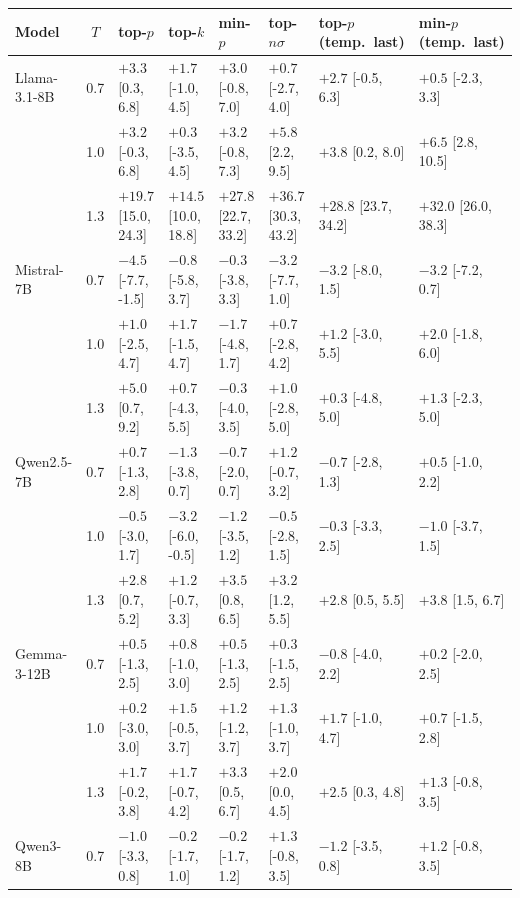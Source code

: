 \begin{tabular}{lcllllll}
\toprule
Model & $T$ & top-$p$ & top-$k$ & min-$p$ & top-$n\sigma$ & top-$p$ (temp.\ last) & min-$p$ (temp.\ last) \\
\midrule
Llama-3.1-8B & 0.7 & $\mathbf{+3.3}$ [0.3, 6.8] & $+1.7$ [-1.0, 4.5] & $+3.0$ [-0.8, 7.0] & $+0.7$ [-2.7, 4.0] & $+2.7$ [-0.5, 6.3] & $+0.5$ [-2.3, 3.3] \\
 & 1.0 & $+3.2$ [-0.3, 6.8] & $+0.3$ [-3.5, 4.5] & $+3.2$ [-0.8, 7.3] & $\mathbf{+5.8}$ [2.2, 9.5] & $\mathbf{+3.8}$ [0.2, 8.0] & $\mathbf{+6.5}$ [2.8, 10.5] \\
 & 1.3 & $\mathbf{+19.7}$ [15.0, 24.3] & $\mathbf{+14.5}$ [10.0, 18.8] & $\mathbf{+27.8}$ [22.7, 33.2] & $\mathbf{+36.7}$ [30.3, 43.2] & $\mathbf{+28.8}$ [23.7, 34.2] & $\mathbf{+32.0}$ [26.0, 38.3] \\
\midrule
Mistral-7B & 0.7 & $-4.5$ [-7.7, -1.5] & $-0.8$ [-5.8, 3.7] & $-0.3$ [-3.8, 3.3] & $-3.2$ [-7.7, 1.0] & $-3.2$ [-8.0, 1.5] & $-3.2$ [-7.2, 0.7] \\
 & 1.0 & $+1.0$ [-2.5, 4.7] & $+1.7$ [-1.5, 4.7] & $-1.7$ [-4.8, 1.7] & $+0.7$ [-2.8, 4.2] & $+1.2$ [-3.0, 5.5] & $+2.0$ [-1.8, 6.0] \\
 & 1.3 & $\mathbf{+5.0}$ [0.7, 9.2] & $+0.7$ [-4.3, 5.5] & $-0.3$ [-4.0, 3.5] & $+1.0$ [-2.8, 5.0] & $+0.3$ [-4.8, 5.0] & $+1.3$ [-2.3, 5.0] \\
\midrule
Qwen2.5-7B & 0.7 & $+0.7$ [-1.3, 2.8] & $-1.3$ [-3.8, 0.7] & $-0.7$ [-2.0, 0.7] & $+1.2$ [-0.7, 3.2] & $-0.7$ [-2.8, 1.3] & $+0.5$ [-1.0, 2.2] \\
 & 1.0 & $-0.5$ [-3.0, 1.7] & $-3.2$ [-6.0, -0.5] & $-1.2$ [-3.5, 1.2] & $-0.5$ [-2.8, 1.5] & $-0.3$ [-3.3, 2.5] & $-1.0$ [-3.7, 1.5] \\
 & 1.3 & $\mathbf{+2.8}$ [0.7, 5.2] & $+1.2$ [-0.7, 3.3] & $\mathbf{+3.5}$ [0.8, 6.5] & $\mathbf{+3.2}$ [1.2, 5.5] & $\mathbf{+2.8}$ [0.5, 5.5] & $\mathbf{+3.8}$ [1.5, 6.7] \\
\midrule
Gemma-3-12B & 0.7 & $+0.5$ [-1.3, 2.5] & $+0.8$ [-1.0, 3.0] & $+0.5$ [-1.3, 2.5] & $+0.3$ [-1.5, 2.5] & $-0.8$ [-4.0, 2.2] & $+0.2$ [-2.0, 2.5] \\
 & 1.0 & $+0.2$ [-3.0, 3.0] & $+1.5$ [-0.5, 3.7] & $+1.2$ [-1.2, 3.7] & $+1.3$ [-1.0, 3.7] & $+1.7$ [-1.0, 4.7] & $+0.7$ [-1.5, 2.8] \\
 & 1.3 & $+1.7$ [-0.2, 3.8] & $+1.7$ [-0.7, 4.2] & $\mathbf{+3.3}$ [0.5, 6.7] & $+2.0$ [0.0, 4.5] & $\mathbf{+2.5}$ [0.3, 4.8] & $+1.3$ [-0.8, 3.5] \\
\midrule
Qwen3-8B & 0.7 & $-1.0$ [-3.3, 0.8] & $-0.2$ [-1.7, 1.0] & $-0.2$ [-1.7, 1.2] & $+1.3$ [-0.8, 3.5] & $-1.2$ [-3.5, 0.8] & $+1.2$ [-0.8, 3.5] \\

\end{tabular}
